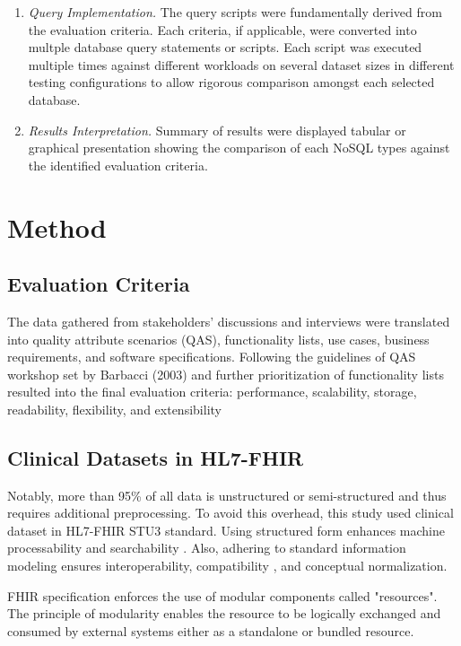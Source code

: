 \documentclass[5p]{elsarticle}
\begin{document}
\begin{enumerate}
\item \emph{Query Implementation.} 
The query scripts were fundamentally derived from the evaluation criteria. 
Each criteria, if applicable, were converted into multple database query statements or scripts.
Each script was executed multiple times against different workloads on several dataset sizes in different testing configurations to allow rigorous comparison amongst each selected database.

\item \emph{Results Interpretation.} 
Summary of results were displayed tabular or graphical presentation showing the comparison of each NoSQL types against the identified evaluation criteria.
\end{enumerate}

\section{Method}

\subsection{Evaluation Criteria}

The data gathered from stakeholders' discussions and interviews were translated into quality attribute scenarios (QAS), functionality lists, use cases, business requirements, and software specifications.
Following the guidelines of QAS workshop set by Barbacci (2003) \cite{M.R.Barbacci2003} and further prioritization of functionality lists 
resulted into the final evaluation criteria: performance, scalability, storage, readability, flexibility, and extensibility

\subsection{Clinical Datasets in HL7-FHIR}
Notably, more than 95\% of all data is unstructured or semi-structured \cite{A.Gandomi2014137} and thus requires additional preprocessing. 
To avoid this overhead, this study used clinical dataset in HL7-FHIR STU3 standard. 
Using structured form enhances machine processability and searchability \cite{G.Weglarz200419}.
Also, adhering to standard information modeling ensures interoperability, compatibility \cite{K.Lee201299}, and conceptual normalization.

FHIR specification enforces the use of modular components called "resources".
The principle of modularity enables the resource to be logically exchanged and consumed by external systems either as a standalone or bundled resource. 
\end{document}
